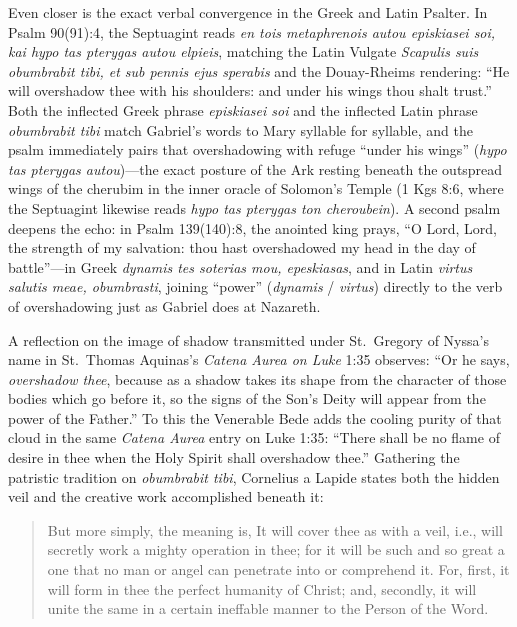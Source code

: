 Even closer is the exact verbal convergence in the Greek and Latin Psalter. In Psalm 90(91):4, the Septuagint reads \textit{en tois metaphrenois autou episkiasei soi, kai hypo tas pterygas autou elpieis}, matching the Latin Vulgate \textit{Scapulis suis obumbrabit tibi, et sub pennis ejus sperabis} and the Douay-Rheims rendering: ``He will overshadow thee with his shoulders: and under his wings thou shalt trust.'' Both the inflected Greek phrase \textit{episkiasei soi} and the inflected Latin phrase \textit{obumbrabit tibi} match Gabriel's words to Mary syllable for syllable, and the psalm immediately pairs that overshadowing with refuge ``under his wings'' (\textit{hypo tas pterygas autou})---the exact posture of the Ark resting beneath the outspread wings of the cherubim in the inner oracle of Solomon's Temple (1 Kgs 8:6, where the Septuagint likewise reads \textit{hypo tas pterygas ton cheroubein}). A second psalm deepens the echo: in Psalm 139(140):8, the anointed king prays, ``O Lord, Lord, the strength of my salvation: thou hast overshadowed my head in the day of battle''---in Greek \textit{dynamis tes soterias mou, epeskiasas}, and in Latin \textit{virtus salutis meae, obumbrasti}, joining ``power'' (\textit{dynamis} / \textit{virtus}) directly to the verb of overshadowing just as Gabriel does at Nazareth.

A reflection on the image of shadow transmitted under St.\ Gregory of Nyssa's name in St.\ Thomas Aquinas's \textit{Catena Aurea on Luke} 1:35 observes: ``Or he says, \textit{overshadow thee}, because as a shadow takes its shape from the character of those bodies which go before it, so the signs of the Son's Deity will appear from the power of the Father.'' To this the Venerable Bede adds the cooling purity of that cloud in the same \textit{Catena Aurea} entry on Luke 1:35: ``There shall be no flame of desire in thee when the Holy Spirit shall overshadow thee.'' Gathering the patristic tradition on \textit{obumbrabit tibi}, Cornelius a Lapide states both the hidden veil and the creative work accomplished beneath it:

\begin{quote}\small
But more simply, the meaning is, It will cover thee as with a veil, i.e., will secretly work a mighty operation in thee; for it will be such and so great a one that no man or angel can penetrate into or comprehend it. For, first, it will form in thee the perfect humanity of Christ; and, secondly, it will unite the same in a certain ineffable manner to the Person of the Word.
\end{quote}

